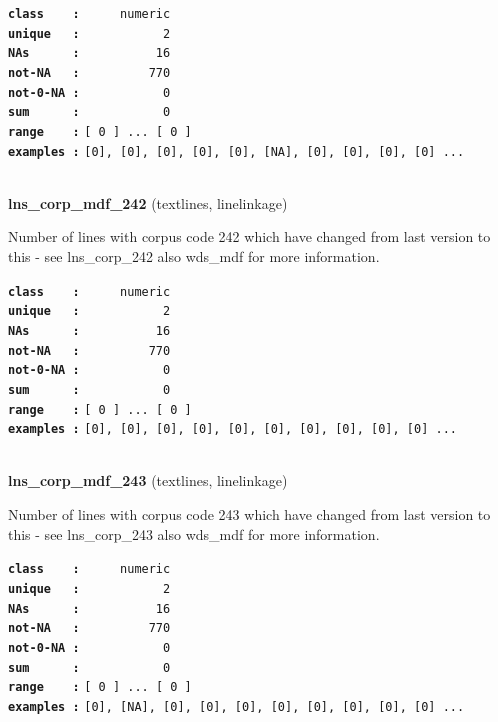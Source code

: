 \documentclass[]{article}
\begin{document}
\textbf{\texttt{class\ \ \ \ :}} \texttt{~~~~~numeric}\\
\textbf{\texttt{unique\ \ \ :}} \texttt{~~~~~~~~~~~2}\\
\textbf{\texttt{NAs\ \ \ \ \ \ :}} \texttt{~~~~~~~~~~16}\\
\textbf{\texttt{not-NA\ \ \ :}} \texttt{~~~~~~~~~770}\\
\textbf{\texttt{not-0-NA\ :}} \texttt{~~~~~~~~~~~0}\\
\textbf{\texttt{sum\ \ \ \ \ \ :}} \texttt{~~~~~~~~~~~0}\\
\textbf{\texttt{range\ \ \ \ :}}
\texttt{{[}\ 0\ {]}\ ...\ {[}\ 0\ {]}}\\
\textbf{\texttt{examples\ :}}
\texttt{{[}0{]},\ {[}0{]},\ {[}0{]},\ {[}0{]},\ {[}0{]},\ {[}NA{]},\ {[}0{]},\ {[}0{]},\ {[}0{]},\ {[}0{]}\ ...}\\

~

\textbf{lns\_corp\_mdf\_242} (textlines, linelinkage)

Number of lines with corpus code 242 which have changed from last
version to this - see lns\_corp\_242 also wds\_mdf for more information.

\textbf{\texttt{class\ \ \ \ :}} \texttt{~~~~~numeric}\\
\textbf{\texttt{unique\ \ \ :}} \texttt{~~~~~~~~~~~2}\\
\textbf{\texttt{NAs\ \ \ \ \ \ :}} \texttt{~~~~~~~~~~16}\\
\textbf{\texttt{not-NA\ \ \ :}} \texttt{~~~~~~~~~770}\\
\textbf{\texttt{not-0-NA\ :}} \texttt{~~~~~~~~~~~0}\\
\textbf{\texttt{sum\ \ \ \ \ \ :}} \texttt{~~~~~~~~~~~0}\\
\textbf{\texttt{range\ \ \ \ :}}
\texttt{{[}\ 0\ {]}\ ...\ {[}\ 0\ {]}}\\
\textbf{\texttt{examples\ :}}
\texttt{{[}0{]},\ {[}0{]},\ {[}0{]},\ {[}0{]},\ {[}0{]},\ {[}0{]},\ {[}0{]},\ {[}0{]},\ {[}0{]},\ {[}0{]}\ ...}\\

~

\textbf{lns\_corp\_mdf\_243} (textlines, linelinkage)

Number of lines with corpus code 243 which have changed from last
version to this - see lns\_corp\_243 also wds\_mdf for more information.

\textbf{\texttt{class\ \ \ \ :}} \texttt{~~~~~numeric}\\
\textbf{\texttt{unique\ \ \ :}} \texttt{~~~~~~~~~~~2}\\
\textbf{\texttt{NAs\ \ \ \ \ \ :}} \texttt{~~~~~~~~~~16}\\
\textbf{\texttt{not-NA\ \ \ :}} \texttt{~~~~~~~~~770}\\
\textbf{\texttt{not-0-NA\ :}} \texttt{~~~~~~~~~~~0}\\
\textbf{\texttt{sum\ \ \ \ \ \ :}} \texttt{~~~~~~~~~~~0}\\
\textbf{\texttt{range\ \ \ \ :}}
\texttt{{[}\ 0\ {]}\ ...\ {[}\ 0\ {]}}\\
\textbf{\texttt{examples\ :}}
\texttt{{[}0{]},\ {[}NA{]},\ {[}0{]},\ {[}0{]},\ {[}0{]},\ {[}0{]},\ {[}0{]},\ {[}0{]},\ {[}0{]},\ {[}0{]}\ ...}\\
\end{document}
